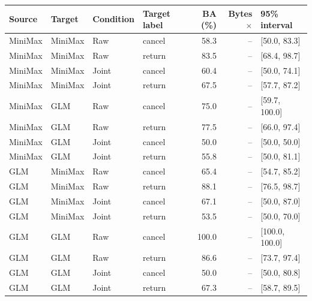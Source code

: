 \begin{center}\small\begin{tabular}{llllrrl}\toprule

Source & Target & Condition & Target label & BA (\%) & Bytes$\times$ & 95\% interval\\\midrule

MiniMax & MiniMax & Raw & cancel & 58.3 & -- & [50.0, 83.3]\\

MiniMax & MiniMax & Raw & return & 83.5 & -- & [68.4, 98.7]\\

MiniMax & MiniMax & Joint & cancel & 60.4 & -- & [50.0, 74.1]\\

MiniMax & MiniMax & Joint & return & 67.5 & -- & [57.7, 87.2]\\

MiniMax & GLM & Raw & cancel & 75.0 & -- & [59.7, 100.0]\\

MiniMax & GLM & Raw & return & 77.5 & -- & [66.0, 97.4]\\

MiniMax & GLM & Joint & cancel & 50.0 & -- & [50.0, 50.0]\\

MiniMax & GLM & Joint & return & 55.8 & -- & [50.0, 81.1]\\

GLM & MiniMax & Raw & cancel & 65.4 & -- & [54.7, 85.2]\\

GLM & MiniMax & Raw & return & 88.1 & -- & [76.5, 98.7]\\

GLM & MiniMax & Joint & cancel & 67.1 & -- & [50.0, 87.0]\\

GLM & MiniMax & Joint & return & 53.5 & -- & [50.0, 70.0]\\

GLM & GLM & Raw & cancel & 100.0 & -- & [100.0, 100.0]\\

GLM & GLM & Raw & return & 86.6 & -- & [73.7, 97.4]\\

GLM & GLM & Joint & cancel & 50.0 & -- & [50.0, 80.8]\\

GLM & GLM & Joint & return & 67.3 & -- & [58.7, 89.5]\\

\bottomrule\end{tabular}\end{center}

